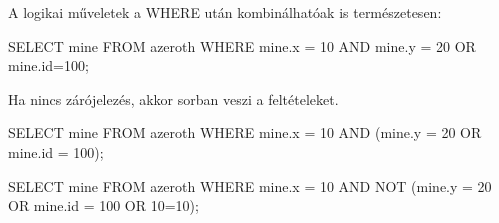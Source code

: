 A logikai műveletek a WHERE után kombinálhatóak is természetesen:

\begin{sql}
SELECT mine FROM azeroth WHERE mine.x = 10 AND mine.y = 20 OR mine.id=100;
\end{sql}

Ha nincs zárójelezés, akkor sorban veszi a feltételeket.

\begin{sql}
SELECT mine FROM azeroth WHERE mine.x = 10 AND (mine.y = 20 OR mine.id = 100);
\end{sql}

\begin{sql}
SELECT mine FROM azeroth WHERE mine.x = 10 AND NOT (mine.y = 20 OR mine.id = 100 OR 10=10);
\end{sql}

